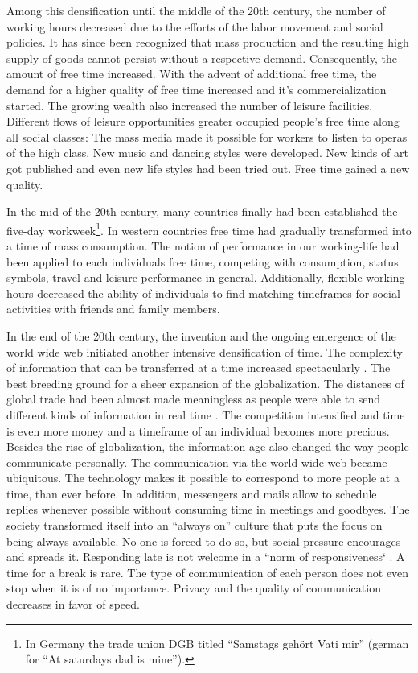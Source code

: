 \documentclass[12pt,numbers=noenddot,parskip,bibliography=totocnumbered,listof=totocnumbered,draft]{scrreprt}
\begin{document}
Among this densification until the middle of the 20th century, the number of working hours decreased due to the efforts of the labor movement and social policies. It has since been recognized that mass production and the resulting high supply of goods cannot persist without a respective demand. Consequently, the amount of free time increased. \citep[p.99-100]{prahl2002} With the advent of additional free time, the demand for a higher quality of free time increased and it's commercialization started. \citep[p.116]{scheuch1972} The growing wealth also increased the number of leisure facilities. Different flows of leisure opportunities greater occupied people's free time along all social classes: The mass media made it possible for workers to listen to operas of the high class. New music and dancing styles were developed. New kinds of art got published and even new life styles had been tried out. Free time gained a new quality. \citep[p.106]{prahl2002}

In the mid of the 20th century, many countries finally had been established the five-day workweek\footnote{In Germany the trade union DGB titled ``Samstags gehört Vati mir'' (german for ``At saturdays dad is mine'').}. In western countries free time had gradually transformed into a time of mass consumption. The notion of performance in our working-life had been applied to each individuals free time, competing with consumption, status symbols, travel and leisure performance in general. \citep[p.112]{prahl2002} Additionally, flexible working-hours decreased the ability of individuals to find matching timeframes for social activities with friends and family members. \citep[p.75]{wajcman2014}

In the end of the 20th century, the invention and the ongoing emergence of the world wide web initiated another intensive densification of time. The complexity of information that can be transferred at a time increased spectacularly \citep[p.45]{wajcman2014}. The best breeding ground for a sheer expansion of the globalization. The distances of global trade had been almost made meaningless as people were able to send different kinds of information in real time \citep[p.17]{wajcman2014}. The competition intensified and time is even more money and a timeframe of an individual becomes more precious. Besides the rise of globalization, the information age also changed the way people communicate personally. The communication via the world wide web became ubiquitous. The technology makes it possible to correspond to more people at a time, than ever before. In addition, messengers and mails allow to schedule replies whenever possible without consuming time in meetings and goodbyes. The society transformed itself into an ``always on'' culture that puts the focus on being always available. No one is forced to do so, but social pressure encourages and spreads it. Responding late is not welcome in a ``norm of responsiveness` \citep[p.96]{wajcman2014}. A time for a break is rare. The type of communication of each person does not even stop when it is of no importance. Privacy and the quality of communication decreases in favor of speed.
\end{document}
